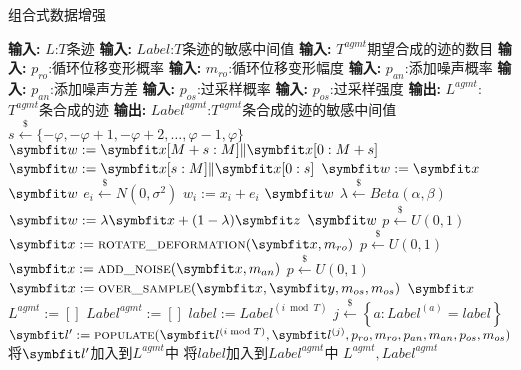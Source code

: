 {	\begin{breakablealgorithm}
		\caption{组合式数据增强}\label{alg:combined-da}
		\begin{algorithmic}[1]
			\Statex \textbf{输入:} $L$:$T$条迹
			\Statex \textbf{输入:} $Label$:$T$条迹的敏感中间值
			\Statex \textbf{输入:} $T^{agmt}$期望合成的迹的数目
			\Statex \textbf{输入:} $p_{ro}$:循环位移变形概率
			\Statex \textbf{输入:} $m_{ro}$:循环位移变形幅度
			\Statex \textbf{输入:} $p_{an}$:添加噪声概率
			\Statex \textbf{输入:} $p_{an}$:添加噪声方差
			\Statex \textbf{输入:} $p_{os}$:过采样概率
			\Statex \textbf{输入:} $p_{os}$:过采样强度
			\Statex \textbf{输出:} $L^{agmt}$:$T^{agmt}$条合成的迹
			\Statex \textbf{输出:} $Label^{agmt}$:$T^{agmt}$条合成的迹的敏感中间值
				\State $s\stackrel{\$}\gets\{-\varphi,-\varphi+1,-\varphi+2,\dots,\varphi-1,\varphi\}$
					\State $\Vector w:=\Vector x[M+s:M]\Vert\Vector x[0:M+s]$
					\State $\Vector w:=\Vector x[s:M]\Vert\Vector x[0:s]$
				\Else
					\State $\Vector w:=\Vector x$
				\EndIf
				\State \Return $\Vector w$
			\EndFunction
			\Statex 
					\State $e_i\stackrel{\$}\gets N(0,\sigma^2)$
					\State $w_i:= x_i+e_i$
				\EndFor
				\State \Return $\Vector w$
			\EndFunction
			\Statex 
				\State $\lambda\stackrel{\$}\gets Beta(\alpha,\beta)$
				\State $\Vector w:=\lambda\Vector x+(1-\lambda)\Vector z$
				\State \Return $\Vector w$
			\EndFunction
			\Statex 
				\State $p\stackrel{\$}\gets U(0,1)$
					\State $\Vector x:= \textsc {rotate\_deformation}(\Vector x,m_{ro})$
				\EndIf
				\State $p\stackrel{\$}\gets U(0,1)$
					\State $\Vector x:= \textsc{add\_noise}(\Vector x,m_{an})$
				\EndIf
				\State $p\stackrel{\$}\gets U(0,1)$
					\State $\Vector x:= \textsc{over\_sample}(\Vector x,\Vector y,m_{os},m_{os})$
				\EndIf
				\State \Return $\Vector x$
			\EndFunction
			\Statex 
			\State $L^{agmt}:=[]$
			\State $Label^{agmt}:=[]$
				\State $label:=Label^{(i\bmod T)}$
				\State $j\stackrel{\$}\gets\left\lbrace a:Label^{(a)}=label\right\rbrace $
				\State $\Vector {l^\prime}:=\textsc{populate}(\Vector {l^{(i\bmod T)}},\Vector l^{(j)},p_{ro},m_{ro},p_{an},m_{an},p_{os},m_{os})$
				\State 将$\Vector {l^\prime}$加入到$L^{agmt}$中
				\State 将$label$加入到$Label^{agmt}$中
			\EndFor
			\State \Return $L^{agmt},Label^{agmt}$
		\end{algorithmic}
	\end{breakablealgorithm}

}
